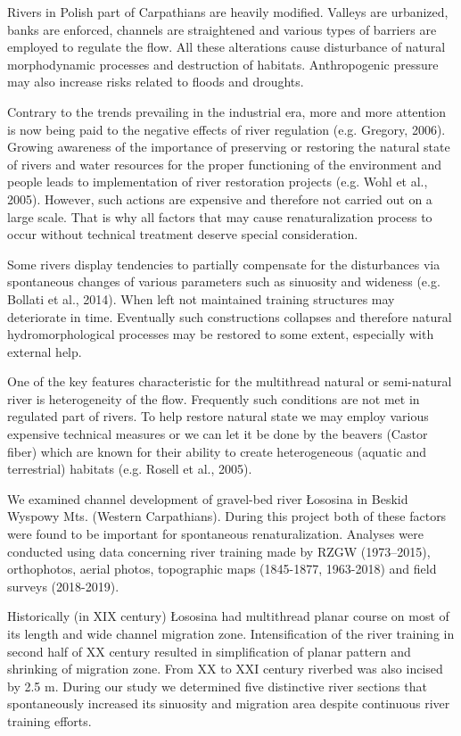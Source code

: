 {Rivers in Polish part of Carpathians are heavily modified. Valleys are urbanized, banks are enforced, channels are straightened and various types of barriers are employed to regulate the flow. All these alterations cause disturbance of natural morphodynamic processes and destruction of habitats. Anthropogenic pressure may also increase risks related to floods and droughts.
	
	Contrary to the trends prevailing in the industrial era, more and more attention is now being paid to the negative effects of river regulation (e.g. Gregory, 2006). Growing awareness of the importance of preserving or restoring the natural state of rivers and water resources for the proper functioning of the environment and people leads to implementation of river restoration projects (e.g. Wohl et al., 2005). However, such actions are expensive and therefore not carried out on a large scale. That is why all factors that may cause renaturalization process to occur without technical treatment deserve special consideration.
	
	Some rivers display tendencies to partially compensate for the disturbances via spontaneous changes of various parameters such as sinuosity and wideness (e.g. Bollati et al., 2014). When left not maintained training structures may deteriorate in time. Eventually such constructions collapses and therefore natural hydromorphological processes may be restored to some extent, especially with external help.
	
	One of the key features characteristic for the multithread natural or semi-natural river is heterogeneity of the flow. Frequently such conditions are not met in regulated part of rivers. To help restore natural state we may employ various expensive technical measures or we can let it be done by the beavers (Castor fiber) which are known for their ability to create heterogeneous (aquatic and terrestrial) habitats (e.g. Rosell et al., 2005).
	
	We examined channel development of gravel-bed river Łososina in Beskid Wyspowy Mts. (Western Carpathians). During this project both of these factors were found to be important for spontaneous renaturalization. Analyses were conducted using data concerning river training made by RZGW (1973–2015), orthophotos, aerial photos, topographic maps (1845-1877, 1963-2018) and field surveys (2018-2019). 
	
	Historically (in XIX century) Łososina had multithread planar course on most of its length and wide channel migration zone. Intensification of the river training in second half of XX century resulted in simplification of planar pattern and shrinking of migration zone. From XX to XXI century riverbed was also incised by 2.5 m. During our study we determined five distinctive river sections that spontaneously increased its sinuosity and migration area despite continuous river training efforts.
	
}
